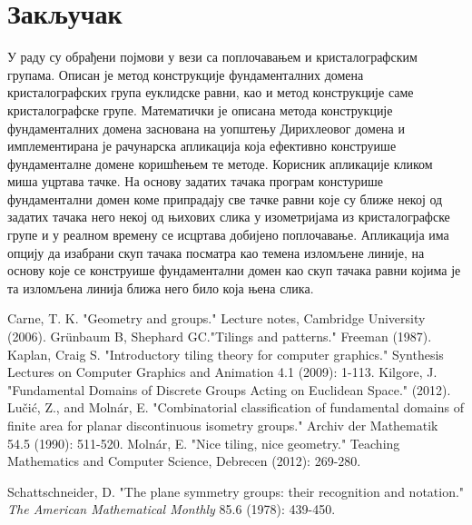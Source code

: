 \documentclass[12pt]{report}
\begin{document}
\chapter {Закључак}
У раду су обрађени појмови у вези са поплочавањем и кристалографским групама. Описан је метод конструкције фундаменталних домена кристалографских група еуклидске равни, као и метод конструкције саме кристалографске групе. Математички је описана метода конструкције фундаменталних домена заснована на уопштењу Дирихлеовог домена и имплементирана је рачунарска апликација која ефективно конструише фундаменталне домене коришћењем те методе. Корисник апликације кликом миша уцртава тачке. На основу задатих тачака програм констурише фундаментални домен коме припрадају све тачке равни које су ближе некој од задатих тачака него некој од њихових слика у изометријама из кристалографске групе и у реалном времену се исцртава добијено поплочавање. Апликација има опцију да изабрани скуп тачака посматра као темена изломљене линије, на основу које се конструише фундаментални домен као скуп тачака равни којима је та изломљена линија ближа него било која њена слика. 




\renewcommand\bibname{Литература}
\begin{thebibliography}{}

  Carne, T. K.  "Geometry and groups." Lecture notes, Cambridge University (2006). 
Grünbaum B, Shephard GC."Tilings and patterns." Freeman (1987).
   Kaplan, Craig S. "Introductory tiling theory for computer graphics."{} Synthesis Lectures on Computer Graphics and Animation 4.1 (2009): 1-113. 
   Kilgore, J. "Fundamental Domains of Discrete Groups Acting on Euclidean Space." (2012). 
  Lučić, Z., and Molnár, E. "{}Combinatorial classification of fundamental domains of finite area for planar discontinuous isometry groups." Archiv der Mathematik 54.5 (1990): 511-520.
 Molnár, E. "Nice tiling, nice geometry." Teaching Mathematics and Computer Science, Debrecen (2012): 269-280.


  Schattschneider, D. "The plane symmetry groups: their recognition
  and notation." \emph{The American Mathematical Monthly} 85.6 (1978):
  439-450.



\end{thebibliography}





	
\end{document}
